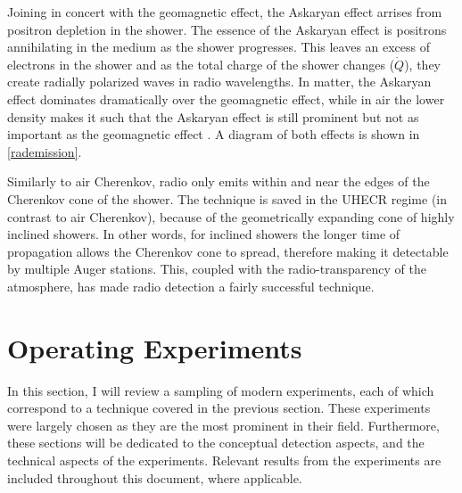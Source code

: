 Joining in concert with the geomagnetic effect, the Askaryan effect arrises from positron depletion in the shower. The essence of the Askaryan effect is positrons annihilating in the medium as the shower progresses. This leaves an excess of electrons in the shower and as the total charge of the shower changes ($\dot{Q}$), they create radially polarized waves in radio wavelengths. In matter, the Askaryan effect dominates dramatically over the geomagnetic effect, while in air the lower density makes it such that the Askaryan effect is still prominent but not as important as the geomagnetic effect \cite{schroeder}. A diagram of both effects is shown in \autoref{rademission}.

Similarly to air Cherenkov, radio only emits within and near the edges of the Cherenkov cone of the shower. The technique is saved in the UHECR regime (in contrast to air Cherenkov), because of the geometrically expanding cone of highly inclined showers. In other words, for inclined showers the longer time of propagation allows the Cherenkov cone to spread, therefore making it detectable by multiple Auger stations. This, coupled with the radio-transparency of the atmosphere, has made radio detection a fairly successful technique.
\section{Operating Experiments}
In this section, I will review a sampling of modern experiments, each of which correspond to a technique covered in the previous section. These experiments were largely chosen as they are the most prominent in their field. Furthermore, these sections will be dedicated to the conceptual detection aspects, and the technical aspects of the experiments. Relevant results from the experiments are included throughout this document, where applicable.
